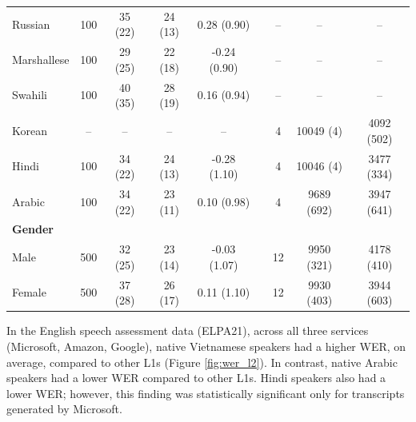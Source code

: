 \documentclass [PhD] {uclathes}
\begin{document}
\begin{table}
\begin{tabular}{lcccccccc}
\hspace{3mm} Russian & 100 & 35 (22) & 24 (13) & 0.28 (0.90) & & -- & -- & -- \\
\hspace{3mm} Marshallese & 100 & 29 (25) & 22 (18) & -0.24 (0.90) & & -- & -- & -- \\
\hspace{3mm} Swahili & 100 & 40 (35) & 28 (19) & 0.16 (0.94) & & -- & -- & -- \\
\hspace{3mm} Korean & -- & -- & -- & -- & & 4 & 10049 (4) & 4092 (502) \\
\hspace{3mm} Hindi & 100 & 34 (22) & 24 (13) & -0.28 (1.10) & & 4 & 10046 (4) & 3477 (334) \\
\hspace{3mm} Arabic & 100 & 34 (22) & 23 (11) & 0.10 (0.98) & & 4 & 9689 (692) & 3947 (641) \\
\textbf{Gender} &  &  &  &  & &  &  &  \\
\hspace{3mm} Male & 500 & 32 (25) & 23 (14) & -0.03 (1.07) & & 12 & 9950 (321) & 4178 (410) \\
\hspace{3mm} Female & 500 & 37 (28) & 26 (17) & 0.11 (1.10) & & 12 & 9930 (403) & 3944 (603) \\
\bottomrule
  \end{tabular}
\end{table}

In the English speech assessment data (ELPA21), across all three services (Microsoft, Amazon, Google), native Vietnamese speakers had a higher WER, on average, compared to other L1s (Figure \ref{fig:wer_l2}). In contrast, native Arabic speakers had a lower WER compared to other L1s. Hindi speakers also had a lower WER; however, this finding was statistically significant only for transcripts generated by Microsoft. 
\end{document}
